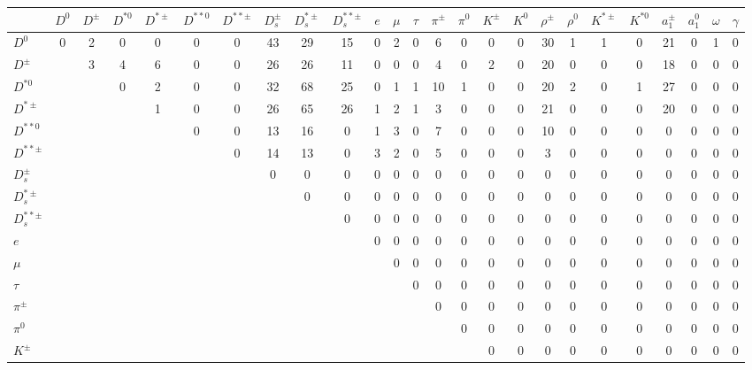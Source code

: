 \documentclass[6pt]{article}
\begin{document}
\begin{landscape} \begin{tabular}{|l||cccc|cc|ccc|ccc|cccc|cccc|cccc|}
\hline
 & $D^0$ & $D^{\pm}$ & $D^{*0}$ & $D^{*\pm}$ & $D^{**0}$ & $D^{**\pm}$ & $D_s^{\pm}$ & $D_s^{*\pm}$ & $D_s^{**\pm}$ & $e$ & $\mu$ & $\tau$ & $\pi^{\pm}$ & $\pi^0$ & $K^{\pm}$ & $K^0$ & $\rho^{\pm}$ & $\rho^0$ & $K^{*\pm}$ & $K^{*0}$ & $a_1^{\pm}$ & $a_1^0$ & $\omega$ & $\gamma$ \\ \hline \hline
$D^0$  & 0 & 2 & 0 & 0 & 0 & 0 & 43 & 29 & 15 & 0 & 2 & 0 & 6 & 0 & 0 & 0 & 30 & 1 & 1 & 0 & 21 & 0 & 1 & 0 \\
$D^{\pm}$  &  & 3 & 4 & 6 & 0 & 0 & 26 & 26 & 11 & 0 & 0 & 0 & 4 & 0 & 2 & 0 & 20 & 0 & 0 & 0 & 18 & 0 & 0 & 0 \\
$D^{*0}$  &  &  & 0 & 2 & 0 & 0 & 32 & 68 & 25 & 0 & 1 & 1 & 10 & 1 & 0 & 0 & 20 & 2 & 0 & 1 & 27 & 0 & 0 & 0 \\
$D^{*\pm}$  &  &  &  & 1 & 0 & 0 & 26 & 65 & 26 & 1 & 2 & 1 & 3 & 0 & 0 & 0 & 21 & 0 & 0 & 0 & 20 & 0 & 0 & 0 \\
\hline 
$D^{**0}$  &  &  &  &  & 0 & 0 & 13 & 16 & 0 & 1 & 3 & 0 & 7 & 0 & 0 & 0 & 10 & 0 & 0 & 0 & 0 & 0 & 0 & 0 \\
$D^{**\pm}$  &  &  &  &  &  & 0 & 14 & 13 & 0 & 3 & 2 & 0 & 5 & 0 & 0 & 0 & 3 & 0 & 0 & 0 & 0 & 0 & 0 & 0 \\
\hline 
$D_s^{\pm}$  &  &  &  &  &  &  & 0 & 0 & 0 & 0 & 0 & 0 & 0 & 0 & 0 & 0 & 0 & 0 & 0 & 0 & 0 & 0 & 0 & 0 \\
$D_s^{*\pm}$  &  &  &  &  &  &  &  & 0 & 0 & 0 & 0 & 0 & 0 & 0 & 0 & 0 & 0 & 0 & 0 & 0 & 0 & 0 & 0 & 0 \\
$D_s^{**\pm}$  &  &  &  &  &  &  &  &  & 0 & 0 & 0 & 0 & 0 & 0 & 0 & 0 & 0 & 0 & 0 & 0 & 0 & 0 & 0 & 0 \\
\hline 
$e$  &  &  &  &  &  &  &  &  &  & 0 & 0 & 0 & 0 & 0 & 0 & 0 & 0 & 0 & 0 & 0 & 0 & 0 & 0 & 0 \\
$\mu$  &  &  &  &  &  &  &  &  &  &  & 0 & 0 & 0 & 0 & 0 & 0 & 0 & 0 & 0 & 0 & 0 & 0 & 0 & 0 \\
$\tau$  &  &  &  &  &  &  &  &  &  &  &  & 0 & 0 & 0 & 0 & 0 & 0 & 0 & 0 & 0 & 0 & 0 & 0 & 0 \\
\hline 
$\pi^{\pm}$  &  &  &  &  &  &  &  &  &  &  &  &  & 0 & 0 & 0 & 0 & 0 & 0 & 0 & 0 & 0 & 0 & 0 & 0 \\
$\pi^0$  &  &  &  &  &  &  &  &  &  &  &  &  &  & 0 & 0 & 0 & 0 & 0 & 0 & 0 & 0 & 0 & 0 & 0 \\
$K^{\pm}$  &  &  &  &  &  &  &  &  &  &  &  &  &  &  & 0 & 0 & 0 & 0 & 0 & 0 & 0 & 0 & 0 & 0 \\

\end{tabular}
\end{landscape}
\end{document}
